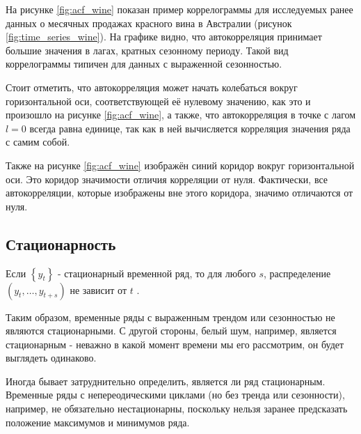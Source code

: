 На рисунке \ref{fig:acf_wine} показан пример коррелограммы для исследуемых 
ранее данных о месячных продажах красного вина в Австралии 
(рисунок \ref{fig:time_series_wine}). На графике видно, что автокорреляция принимает 
большие значения в лагах, кратных сезонному периоду. Такой вид коррелограммы 
типичен для данных с выраженной сезонностью.

Стоит отметить, что автокорреляция может начать колебаться вокруг горизонтальной оси, 
соответствующей её нулевому значению, как это и произошло на рисунке \ref{fig:acf_wine}, 
а также, что автокорреляция в точке с лагом $l = 0$ всегда равна единице, 
так как в ней вычисляется корреляция значения ряда с самим собой.

Также на рисунке \ref{fig:acf_wine} изображён синий коридор вокруг горизонтальной оси. 
Это коридор значимости отличия корреляции от нуля. Фактически, все автокорреляции, 
которые изображены вне этого коридора, значимо отличаются от нуля.

\subsection{Стационарность}

Если $\left\{y_t\right\}$ - стационарный временной ряд, то 
для любого $s$, распределение $(y_t, \dots, y_{t+s})$ не зависит 
от $t$ \cite{Forecasting_Hyndman}. 

Таким образом, временные ряды с выраженным трендом или сезонностью не являются стационарными.
С другой стороны, белый шум, например, является стационарным - неважно в какой момент времени 
мы его рассмотрим, он будет выглядеть одинаково.

Иногда бывает затруднительно определить, является ли ряд стационарным. Временные ряды с 
непереодическими циклами (но без тренда или сезонности), например, не обязательно нестационарны, поскольку 
нельзя заранее предсказать положение максимумов и минимумов ряда.

